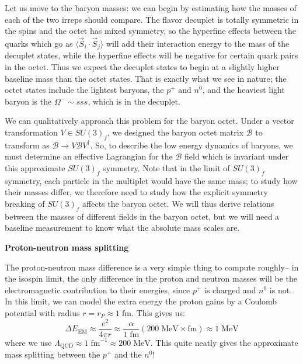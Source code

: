 \documentclass[11pt, oneside]{article}   	%
\theoremstyle{definition}
\numberwithin{equation}{subsection}		%
\newenvironment{answer}{\begin{center}\begin{answerbox}}{\end{answerbox}\end{center}}
\begin{document}
Let us move to the baryon masses: we can begin by estimating how the masses of each of the two irreps should compare. The flavor decuplet is totally symmetric in the spins 
and the octet has mixed symmetry, so the hyperfine effects between the quarks which go as $\langle \vec S_i\cdot\vec S_j\rangle$ will add their 
interaction energy to the mass of the decuplet states, while the hyperfine effects will be negative for certain quark pairs in the octet. Thus we expect 
the decuplet states to begin at a slightly higher baseline mass than the octet states. That is exactly what we see in nature; the octet states include the 
lightest baryons, the $p^+$ and $n^0$, and the heaviest light baryon is the $\Omega^- \sim sss$, which is in the decuplet. 

We can qualitatively approach this problem for the baryon octet. Under a vector transformation $V\in SU(3)_f$, we designed the baryon octet matrix $\mathcal B$ 
to transform as $\mathcal B\rightarrow V \mathcal B V^\dagger$. So, to describe the low energy dynamics of baryons, we must determine an effective Lagrangian for 
the $\mathcal B$ field which is invariant under this approximate $SU(3)_f$ symmetry. Note that in the limit of $SU(3)_f$ symmetry, each particle in the multiplet would have the 
same mass; to study how their masses differ, we therefore need to study how the explicit symmetry breaking of $SU(3)_f$ affects the baryon octet. We will thus derive relations 
between the masses of different fields in the baryon octet, but we will need a baseline measurement to know what the absolute mass scales are.

\begin{answer}
\textbf{Proton-neutron mass splitting} 

\begin{flushleft} \setlength{\parindent}{2em}
	The proton-neutron mass difference is a very simple thing to compute roughly-- in the isospin limit, the only difference in the proton and neutron 
	masses will be the electromagnetic contribution to their energies, since $p^+$ is charged and $n^0$ is not. In this limit, we can model the extra 
	energy the proton gains by a Coulomb potential with radius $r = r_P\approx 1 \;\mathrm{fm}$. This gives us:
	\begin{equation}
		\Delta E_\mathrm{EM}\approx \frac{e^2}{4\pi r} \approx \frac{\alpha}{1\;\mathrm{fm}}(200\;\mathrm{MeV}\times\mathrm{fm})\approx 1 \;\mathrm{MeV}
	\end{equation}
	where we use $\Lambda_\mathrm{QCD}\approx 1\;\mathrm{fm}^{-1}\approx 200\;\mathrm{MeV}$. This quite neatly gives the approximate 
	mass splitting between the $p^+$ and the $n^0$!
\end{flushleft}
\end{answer}
\end{document}
